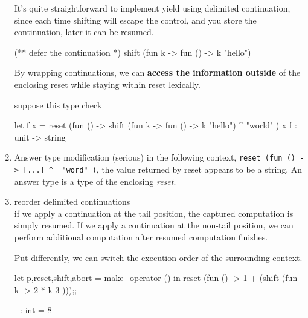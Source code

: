 \begin{enumerate}
It's quite straightforward to implement yield using delimited
continuation, since each time shifting will escape the control, and you store the continuation, later it can be resumed.


\begin{bluetext}
(** defer the continuation *)  
shift (fun k -> fun () -> k "hello")
\end{bluetext}

By wrapping continuations, we can \textbf{access the information outside} of the enclosing
reset while staying within reset lexically.

suppose this type check

\begin{alternate}
  let f x = reset (fun () -> shift (fun k -> fun () -> k "hello") ^ "world" ) x
  f : unit -> string 
\end{alternate}

\item Answer type modification (serious)
  in the following context,
  \verb|reset (fun () -> [...] ^  "word" )|, the value returned by
  reset appears to be a string. An answer type is a type of the enclosing
  \emph{reset}.

\item reorder delimited continuations \\
  if we apply a continuation at the tail position, the captured computation is simply
  resumed. If we apply a continuation at the non-tail position, we can perform
  additional computation after resumed computation finishes.

  Put differently, we can switch the execution order of the surrounding context.

\begin{redcode}
let p,reset,shift,abort = make_operator () in
    reset (fun () -> 1 + (shift (fun k -> 2 * k 3 )));;
\end{redcode}
\begin{bluecode}
- : int = 8    
\end{bluecode}


\end{enumerate}
